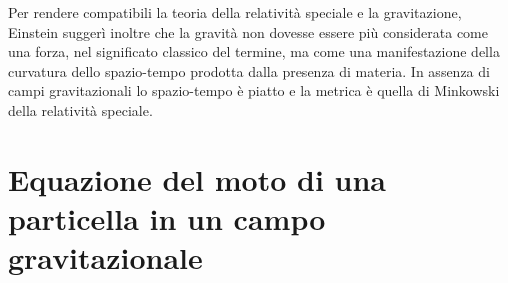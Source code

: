 Per rendere compatibili la teoria della relatività speciale e la gravitazione,
Einstein suggerì inoltre che la gravità non dovesse essere più considerata come
una forza, nel significato classico del termine, ma come una manifestazione
della curvatura dello spazio-tempo prodotta dalla presenza di materia.  In
assenza di campi gravitazionali lo spazio-tempo è piatto e la metrica è quella
di Minkowski della relatività speciale.

\section{Equazione del moto di una particella in un campo gravitazionale}
\label{sec:equazione-moto}

